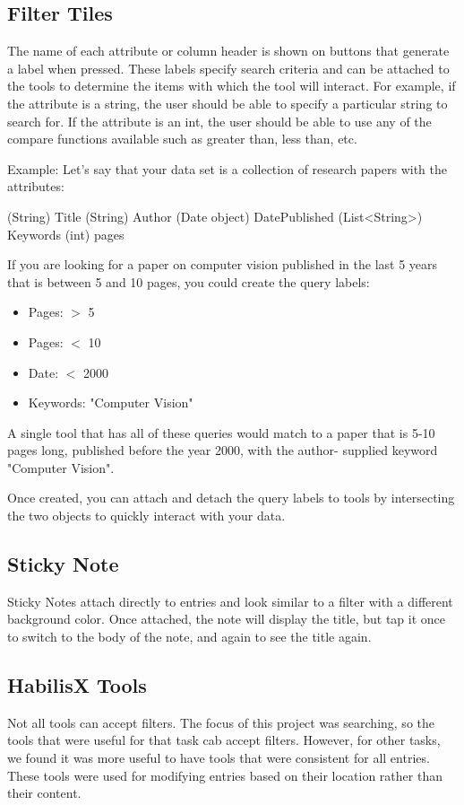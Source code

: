 \documentclass{article}
\begin{document}
\subsection{Filter Tiles}
The name of each attribute or column header is shown on buttons that generate a label when pressed. These labels specify search criteria and can be attached to the tools to determine the items with which the tool will interact. For example, if the attribute is a string, the user should be able to specify a particular string to search for. If the attribute is an int, the user should be able to use any of the compare functions available such as greater than, less than, etc. 

Example: Let's say that your data set is a collection of research papers with the attributes: 

(String) Title
(String) Author
(Date object) DatePublished
(List<String>) Keywords
(int) pages

If you are looking for a paper on computer vision published in the last 5 years that is between 5 and 10 pages, you could create the query labels:
\begin{itemize}
\item Pages: $>$ 5
\item Pages: $<$ 10
\item Date: $<$ 2000
\item Keywords: "Computer Vision"

\end{itemize}

A single tool that has all of these queries would match to a paper that is 5-10 pages long, published before the year 2000, with the author- supplied keyword "Computer Vision".


Once created, you can attach and detach the query labels to tools by intersecting the two objects to quickly interact with your data.

\subsection*{Sticky Note}
Sticky Notes attach directly to entries and look similar to a filter with a different background color.  Once attached, the note will display the title, but tap it once to switch to the body of the note, and again to see the title again.
\subsection{HabilisX Tools}
Not all tools can accept filters.  The focus of this project was searching, so the tools that were useful for that task cab accept filters. However, for other tasks, we found it was more useful to have tools that were consistent for all entries.  These tools were used for modifying entries based on their location rather than their content.   	
\end{document}
